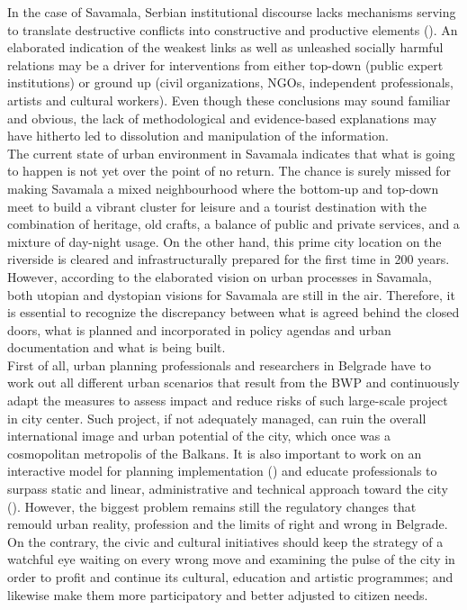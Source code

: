 \documentclass[11pt]{report}
\begin{document}
In the case of Savamala, Serbian institutional discourse lacks mechanisms serving to translate destructive conflicts into constructive and productive elements (\href{Vujoseivc}{\cite{(VujosevicEtAl.2015}}).
An elaborated indication of the weakest links as well as unleashed socially harmful relations may be a driver for interventions from either top-down (public expert institutions) or ground up (civil organizations, NGOs, independent professionals, artists and cultural workers).
Even though these conclusions may sound familiar and obvious, the lack of methodological and evidence-based explanations may have hitherto led to dissolution and manipulation of the information.
\\

The current state of urban environment in Savamala indicates that what is going to happen is not yet over the point of no return.
The chance is surely missed for making Savamala a mixed neighbourhood where the bottom-up and top-down meet to build a vibrant cluster for leisure and a tourist destination with the combination of heritage, old crafts, a balance of public and private services, and a mixture of day-night usage.
On the other hand, this prime city location on the riverside is cleared and infrastructurally prepared for the first time in 200 years.
However, according to the elaborated vision on urban processes in Savamala, both utopian and dystopian visions for Savamala are still in the air.
Therefore, it is essential to recognize the discrepancy between what is agreed behind the closed doors, what is planned and incorporated in policy agendas and urban documentation and what is being built.
\\

First of all, urban planning professionals and researchers in Belgrade have to work out all different urban scenarios that result from the BWP and continuously adapt the measures to assess impact and reduce risks of such large-scale project in city center.
Such project, if not adequately managed, can ruin the overall international image and urban potential of the city, which once was a cosmopolitan metropolis of the Balkans.
It is also important to work on an interactive model for planning implementation (\href{Alexander}{\cite{Alexander and Faludi 1989 ?????}}) and educate professionals to surpass static and linear, administrative and technical approach toward the city (\href{Stojkov}{\cite{Stojkov2012}}).
However, the biggest problem remains still the regulatory changes that remould urban reality, profession and the limits of right and wrong in Belgrade.
On the contrary, the civic and cultural initiatives should keep the strategy of a watchful eye waiting on every wrong move and examining the pulse of the city in order to profit and continue its cultural, education and artistic programmes; and likewise make them more participatory and better adjusted to citizen needs.
\\
\end{document}
